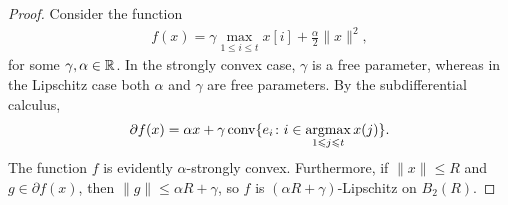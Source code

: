 \begin{proof}
Consider the function
\begin{align*}
    f(x) = \gamma \max_{1 \leq i \leq t} x[i] + \frac{\alpha}{2} \|x\|^2,
\end{align*}
for some $\gamma, \alpha \in \mathbb{R}$. In the strongly convex case, $\gamma$ is
a free parameter, whereas in the Lipschitz case both $\alpha$ and $\gamma$ are
free parameters. By the subdifferential calculus,
\begin{align*}
    \partial f(x) 
        = \alpha x + \gamma \mathop{\rm conv}\{e_i \colon i \in \mathop{\rm argmax}_{1 \leqslant j \leqslant t} x(j)\}.
\end{align*}
The function $f$ is evidently $\alpha$-strongly convex. Furthermore, if $\|x\| \leq R$
and $g \in \partial f(x)$, then $\|g\| \leq \alpha R + \gamma$, so $f$ is
$(\alpha R + \gamma)$-Lipschitz on $B_2(R)$.


\end{proof}
